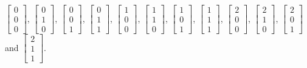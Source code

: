 \documentclass[12pt]{article}
\begin{document}
$\begin{bmatrix}0 \\ 0 \\ 0 \end{bmatrix}$,
$\begin{bmatrix}0 \\ 1 \\ 0 \end{bmatrix}$,
$\begin{bmatrix}0 \\ 0 \\ 1 \end{bmatrix}$,
$\begin{bmatrix}0 \\ 1 \\ 1 \end{bmatrix}$,
$\begin{bmatrix}1 \\ 0 \\ 0 \end{bmatrix}$,
$\begin{bmatrix}1 \\ 1 \\ 0 \end{bmatrix}$,
$\begin{bmatrix}1 \\ 0 \\ 1 \end{bmatrix}$,
$\begin{bmatrix}1 \\ 1 \\ 1 \end{bmatrix}$,
$\begin{bmatrix}2 \\ 0 \\ 0 \end{bmatrix}$,
$\begin{bmatrix}2 \\ 1 \\ 0 \end{bmatrix}$,
$\begin{bmatrix}2 \\ 0 \\ 1 \end{bmatrix}$ and
$\begin{bmatrix}2 \\ 1 \\ 1 \end{bmatrix}$.
\end{document}
